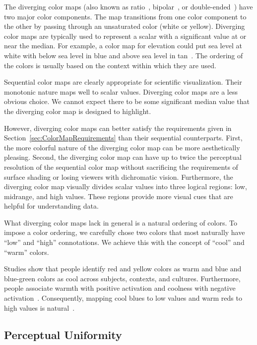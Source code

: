 \documentclass{acmsiggraph}               %
\newcommand{\lcite}[1]{~\cite{#1}}
\begin{document}
The diverging color maps (also known as ratio\lcite{Ware04},
bipolar\lcite{Spence01}, or double-ended\lcite{Rheingans99}) have two major
color components.  The map transitions from one color component to the
other by passing through an unsaturated color (white or yellow).  Diverging
color maps are typically used to represent a scalar with a significant
value at or near the median.  For example, a color map for elevation could
put sea level at white with below sea level in blue and above sea level in
tan\lcite{Tufte97}.  The ordering of the colors is usually based on the
context within which they are used.

Sequential color maps are clearly appropriate for scientific visualization.
Their monotonic nature maps well to scalar values.  Diverging color maps
are a less obvious choice.  We cannot expect there to be some significant
median value that the diverging color map is designed to highlight.

However, diverging color maps can better satisfy the requirements given in
Section~\ref{sec:ColorMapRequirements} than their sequential counterparts.
First, the more colorful nature of the diverging color map can be more
aesthetically pleasing.  Second, the diverging color map can have up to
twice the perceptual resolution of the sequential color map without
sacrificing the requirements of surface shading or losing viewers
with dichromatic vision.  Furthermore, the diverging color map visually
divides scalar values into three logical regions: low, midrange, and high
values.  These regions provide more visual cues that are helpful for
understanding data.

What diverging color maps lack in general is a natural ordering of colors.
To impose a color ordering, we carefully chose two colors that most
naturally have ``low'' and ``high'' connotations.  We achieve this with the
concept of ``cool'' and ``warm'' colors.

Studies show that people identify red and yellow colors as warm and blue and
blue-green colors as cool across subjects, contexts, and
cultures.  Furthermore, people associate warmth with positive activation
and coolness with negative activation\lcite{Hardin97}.  Consequently,
mapping cool blues to low values and warm reds to high values is
natural\lcite{Fortner97}.


\subsection{Perceptual Uniformity}
\label{sec:PerceptualUniformity}
\end{document}
